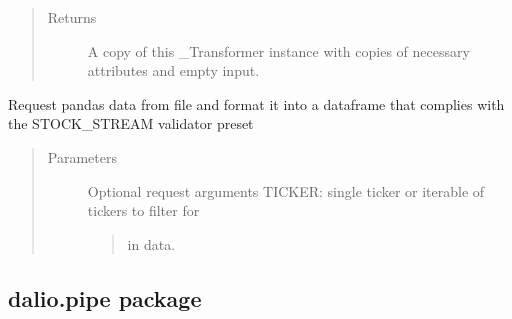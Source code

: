 \documentclass[letterpaper,10pt,english]{sphinxmanual}
\begin{document}
\begin{fulllineitems}
\begin{fulllineitems}
\begin{quote}
\begin{description}
\item[{Returns}] \leavevmode
A copy of this \_Transformer instance with copies of necessary
attributes and empty input.

\end{description}\end{quote}

\end{fulllineitems}


\begin{fulllineitems}
\label{\detokenize{dalio.translator:dalio.translator.StockStreamFileTranslator.run}}
Request pandas data from file and format it into a dataframe that
complies with the STOCK\_STREAM validator preset
\begin{quote}\begin{description}
\item[{Parameters}] \leavevmode
{} \textendash{} 
Optional request arguments
TICKER: single ticker or iterable of tickers to filter for
\begin{quote}

in data.
\end{quote}


\end{description}\end{quote}

\end{fulllineitems}


\begin{fulllineitems}
\label{\detokenize{dalio.translator:dalio.translator.StockStreamFileTranslator.translations}}
\end{fulllineitems}


\end{fulllineitems}



\subsection{dalio.pipe package}
\label{\detokenize{dalio.pipe:dalio-pipe-package}}\label{\detokenize{dalio.pipe::doc}}
\end{document}
